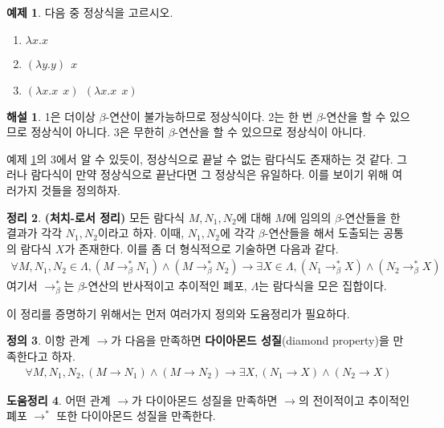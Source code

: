 \documentclass[b5paper, 11pt]{book}
\theoremstyle{definition}
\newtheorem{defn}{정의}[chapter]
\newtheorem{thm}[defn]{정리}
\newtheorem{ex}[defn]{예제}
\newtheorem{lem}[defn]{도움정리}
\newtheorem*{ans*}{해설}
\begin{document}
\begin{ex}
    \label{normal form ex}
    다음 중 정상식을 고르시오.
    \begin{enumerate}
        \item $\lambda x. x$
        \item $(\lambda y. y) \;\, x$
        \item $(\lambda x.x \;\, x) \;\, (\lambda x. x \;\, x)$
    \end{enumerate}
\end{ex}
\begin{ans*}
    1은 더이상 $\beta$-연산이 불가능하므로 정상식이다. 2는 한 번 $\beta$-연산을 할 수 있으므로 정상식이 아니다. 3은 무한히 $\beta$-연산을 할 수 있으므로 정상식이 아니다.
\end{ans*}
예제 \ref{normal form ex}의 3에서 알 수 있듯이, 정상식으로 끝날 수 없는 람다식도 존재하는 것 같다. 그러나 람다식이 만약 정상식으로 끝난다면 그 정상식은 유일하다. 이를 보이기 위해 여러가지 것들을 정의하자.
\begin{thm} \label{church-rosser}
    \textbf{(처치-로서 정리)} 모든 람다식 $M, N_1, N_2$에 대해 $M$에  임의의 $\beta$-연산들을 한 결과가 각각 $N_1, N_2$이라고 하자. 이때, $N_1, N_2$에 각각 $\beta$-연산들을 해서 도출되는 공통의 람다식 $X$가 존재한다. 이를 좀 더 형식적으로 기술하면 다음과 같다.
    \begin{align*}
        \forall M, N_1, N_2 \in \Lambda, (M \rightarrow_\beta^* N_1) \wedge (M \rightarrow_\beta^* N_2) \rightarrow \exists X \in \Lambda, (N_1 \rightarrow_\beta^* X) \wedge (N_2 \rightarrow_\beta^* X)
    \end{align*}
    여기서 $\rightarrow_\beta^*$는 $\beta$-연산의 반사적이고 추이적인 폐포, $\Lambda$는 람다식을 모은 집합이다.
\end{thm}
이 정리를 증명하기 위해서는 먼저 여러가지 정의와 도윰정리가 필요하다.
\begin{defn}
    이항 관계 $\rightarrow$가 다음을 만족하면 \textbf{다이아몬드 성질}(diamond property)을 만족한다고 하자.
    \begin{align*}
        \forall M, N_1, N_2, (M \rightarrow N_1) \wedge (M \rightarrow N_2) \rightarrow \exists X, (N_1 \rightarrow X) \wedge (N_2 \rightarrow X)
    \end{align*}
\end{defn}
\begin{lem} \label{diamond property lemma}
    어떤 관계 $\rightarrow$가 다이아몬드 성질을 만족하면 $\rightarrow$의 전이적이고 추이적인 폐포 $\rightarrow^*$ 또한 다이아몬드 성질을 만족한다.
\end{lem}
\end{document}
